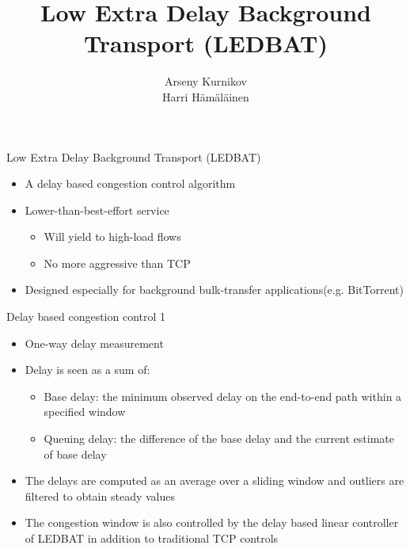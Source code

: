 \documentclass{beamer}
\title{Low Extra Delay Background Transport (LEDBAT)}
\author{Arseny Kurnikov\\
Harri Hämäläinen}
\begin{document}
\begin{frame}
\titlepage
\end{frame}

\begin{frame}{Low Extra Delay Background Transport (LEDBAT)}
    \begin{itemize}
        \item A delay based congestion control algorithm
        \item Lower-than-best-effort service
            \begin{itemize}
                \item Will yield to high-load flows
                \item No more aggressive than TCP
            \end{itemize}
        \item Designed especially for background bulk-transfer applications(e.g. BitTorrent)
    \end{itemize}
\end{frame}

\begin{frame}{Delay based congestion control 1}
    \begin{itemize}
        \item One-way delay measurement
        \item Delay is seen as a sum of:
            \begin{itemize}
                \item Base delay: the minimum observed delay on the end-to-end
                path within a specified window
                \item Queuing delay: the difference of the base delay and the
                current estimate of base delay
            \end{itemize}
        \item The delays are computed as an average over a sliding window and outliers are
        filtered to obtain steady values
        \item The congestion window is also controlled by the delay based linear
        controller of LEDBAT in addition to traditional TCP controls
    \end{itemize}
\end{frame}
\end{document}
